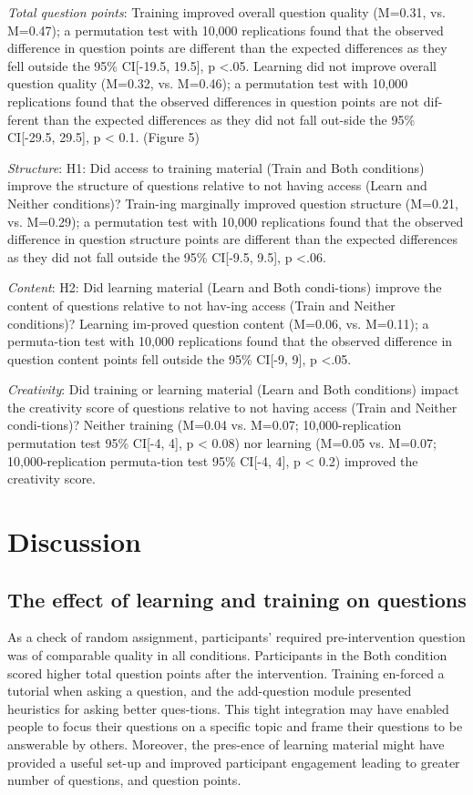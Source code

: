 \textit{Total question points}: Training improved overall question quality (M=0.31, vs. M=0.47); a permutation test with 10,000 replications found that the observed difference in question points are different than the expected differences as they fell outside the 95\% CI[-19.5, 19.5], p <.05. Learning did not improve overall question quality (M=0.32, vs. M=0.46); a permutation test with 10,000 replications found that the observed differences in question points are not dif-ferent than the expected differences as they did not fall out-side the 95\% CI[-29.5, 29.5], p < 0.1. (Figure 5)

\textit{Structure}: H1: Did access to training material (Train and Both conditions) improve the structure of questions relative to not having access (Learn and Neither conditions)? Train-ing marginally improved question structure (M=0.21, vs. M=0.29); a permutation test with 10,000 replications found that the observed difference in question structure points are different than the expected differences as they did not fall outside the 95\% CI[-9.5, 9.5], p <.06.

\textit{Content}: H2: Did learning material (Learn and Both condi-tions) improve the content of questions relative to not hav-ing access (Train and Neither conditions)? Learning im-proved question content (M=0.06, vs. M=0.11); a permuta-tion test with 10,000 replications found that the observed difference in question content points fell outside the 95\% CI[-9, 9], p <.05.

\textit{Creativity}: Did training or learning material (Learn and Both conditions) impact the creativity score of questions relative to not having access (Train and Neither condi-tions)? Neither training (M=0.04 vs. M=0.07; 10,000-replication permutation test 95\% CI[-4, 4], p < 0.08) nor learning (M=0.05 vs. M=0.07; 10,000-replication permuta-tion test 95\% CI[-4, 4], p < 0.2) improved the creativity score.

\section{Discussion}
\subsection{The effect of learning and training on questions}
As a check of random assignment, participants’ required pre-intervention question was of comparable quality in all conditions. Participants in the Both condition scored higher total question points after the intervention. Training en-forced a tutorial when asking a question, and the add-question module presented heuristics for asking better ques-tions. This tight integration may have enabled people to focus their questions on a specific topic and frame their questions to be answerable by others. Moreover, the pres-ence of learning material might have provided a useful set-up and improved participant engagement leading to greater number of questions, and question points.


